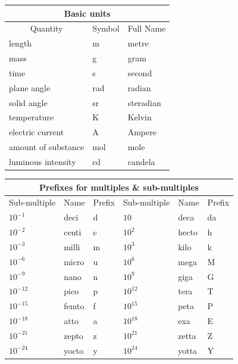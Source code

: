 \documentclass[twoside,11pt]{article}
\renewcommand{\_}{\texttt{\symbol{95}}}
\begin{document}
\begin{center}
\begin{tabular}{|l|l|l|}
\hline
\multicolumn{3}{|c|}{{\large Basic units}} \\ \hline
\multicolumn{1}{|c|}{Quantity} & \multicolumn{1}{|c|}{Symbol} &
\multicolumn{1}{c|}{Full Name} \\ \hline
length              & m   & metre \\
mass                & g   & gram \\
time                & s   & second \\
plane angle         & rad & radian \\
solid angle         & sr  & steradian \\
temperature         & K   & Kelvin \\
electric current    & A   & Ampere \\
amount of substance & mol & mole \\
luminous intensity  & cd  & candela \\
\hline
\end{tabular}
\end{center}

\begin{center}
\begin{tabular}{|lll|lll|}
\hline
\multicolumn{6}{|c|}{{\large Prefixes for multiples \&
sub-multiples}} \\ \hline
\multicolumn{1}{|c}{Sub-multiple} & \multicolumn{1}{c}{Name} &
\multicolumn{1}{c|}{Prefix} &
\multicolumn{1}{|c}{Sub-multiple} & \multicolumn{1}{c}{Name} &
\multicolumn{1}{c|}{Prefix} \\ \hline
$10^{-1}$ & deci & d & $10$ & deca & da \\
$10^{-2}$ & centi & c & $10^{2}$ & hecto & h \\
$10^{-3}$ & milli & m & $10^{3}$ & kilo & k \\
$10^{-6}$ & micro & u & $10^{6}$ & mega & M \\
$10^{-9}$ & nano & n & $10^{9}$ & giga & G \\
$10^{-12}$ & pico & p & $10^{12}$ & tera & T \\
$10^{-15}$ & femto & f & $10^{15}$ & peta & P \\
$10^{-18}$ & atto & a & $10^{18}$ & exa & E \\
$10^{-21}$ & zepto & z & $10^{21}$ & zetta & Z \\
$10^{-24}$ & yocto & y & $10^{24}$ & yotta & Y \\
\hline
\end{tabular}
\end{center}
\end{document}
